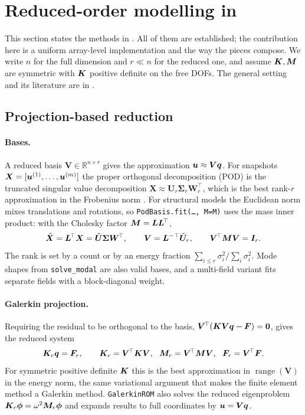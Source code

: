 \section{Reduced-order modelling in \texorpdfstring{\rom{}}{rom\_engine}}\label{sec:rom}

This section states the methods in \rom{}. All of them are established; the contribution here is a uniform array-level implementation and the way the pieces compose. We write $n$ for the full dimension and $r\ll n$ for the reduced one, and
assume $\bm{K},\bm{M}$ are symmetric with $\bm{K}$ positive definite on the free DOFs. The general setting and its literature are in \cite{benner2015survey,hesthaven2016rb,antoulas2005}.

\subsection{Projection-based reduction}\label{sec:rom:proj}
\paragraph{Bases.}
A reduced basis $\bm V\in\mathbb R^{n\times r}$ gives the approximation $\bm{u}\approx\bm V\bm q$. For snapshots $\bm X=[\bm{u}^{(1)},\dots,\bm{u}^{(m)}]$ the proper orthogonal decomposition (POD) is the
truncated singular value decomposition $\bm X\approx\bm U_r\bm\Sigma_r\bm W_r^{\!\top}$, which is the best rank-$r$ approximation in the Frobenius norm \cite{berkooz1993pod}.
For structural models the Euclidean norm mixes translations and rotations, so \texttt{PodBasis.fit(\dots, M=M)} uses the mass inner product: with the Cholesky factor $\bm{M}=\bm L\bm L^{\!\top}$,
\begin{equation}
  \tilde{\bm X}=\bm L^{\!\top}\bm X=\tilde{\bm U}\bm\Sigma\bm W^{\!\top},\qquad \bm V=\bm L^{-\top}\tilde{\bm U}_r,\qquad \bm V^{\!\top}\bm{M}\bm V=\bm I_r .
  \label{eq:pod}
\end{equation}
The rank is set by a count or by an energy fraction $\sum_{i\le r}\sigma_i^2/\sum_i\sigma_i^2$. Mode shapes from \texttt{solve\_modal} are also valid bases, and a multi-field variant fits separate fields with a block-diagonal weight.

\paragraph{Galerkin projection.}
Requiring the residual to be orthogonal to the basis, $\bm V^{\!\top}(\bm{K}\bm V\bm q-\bm{F})=\bm 0$, gives the reduced system
\begin{equation}
  \bm{K}_r\bm q=\bm{F}_r,\qquad \bm{K}_r=\bm V^{\!\top}\bm{K}\bm V,\ \ \bm{M}_r=\bm V^{\!\top}\bm{M}\bm V,\ \ \bm{F}_r=\bm V^{\!\top}\bm{F} .
  \label{eq:galerkin}
\end{equation}
For symmetric positive definite $\bm{K}$ this is the best approximation in $\operatorname{range}(\bm V)$ in the energy norm, the same variational argument that makes the finite element method a Galerkin method. \texttt{GalerkinROM} also solves the reduced
eigenproblem $\bm{K}_r\bm\phi=\omega^2\bm{M}_r\bm\phi$ and expands results to full coordinates by $\bm{u}=\bm V\bm q$.

